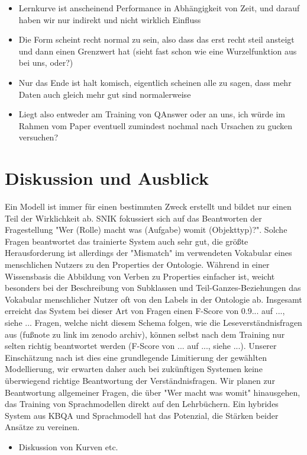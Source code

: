 \documentclass[utf8,biblatex]{lni}
\begin{document}
\begin{itemize}
\begin{itemize}
    \item Lernkurve ist anscheinend Performance in Abhängigkeit von Zeit, und darauf haben wir nur indirekt und nicht wirklich Einfluss
    \item Die Form scheint recht normal zu sein, also dass das erst recht steil ansteigt und dann einen Grenzwert hat (sieht fast schon wie eine Wurzelfunktion aus bei uns, oder?)
    \item Nur das Ende ist halt komisch, eigentlich scheinen alle zu sagen, dass mehr Daten auch gleich mehr gut sind normalerweise
    \item Liegt also entweder am Training von QAnswer oder an uns, ich würde im Rahmen vom Paper eventuell zumindest nochmal nach Ursachen zu gucken versuchen?
  \end{itemize}
\end{itemize}


\section{Diskussion und Ausblick}

Ein Modell ist immer für einen bestimmten Zweck erstellt und bildet nur einen Teil der Wirklichkeit ab.
SNIK fokussiert sich auf das Beantworten der Fragestellung "Wer (Rolle) macht was (Aufgabe) womit (Objekttyp)?".
Solche Fragen beantwortet das trainierte System auch sehr gut, die größte Herausforderung ist allerdings der "Mismatch" im verwendeten Vokabular eines menschlichen Nutzers zu den Properties der Ontologie.
Während in einer Wissensbasis die Abbildung von Verben zu Properties einfacher ist, weicht besonders bei der Beschreibung von Subklassen und Teil-Ganzes-Beziehungen das Vokabular menschlicher Nutzer oft von den Labels in der Ontologie ab.
Insgesamt erreicht das System bei dieser Art von Fragen  einen F-Score von 0.9... auf ..., siehe ...
Fragen, welche nicht diesem Schema folgen, wie die Leseverständnisfragen aus \cite{bb} (fußnote zu link im zenodo archiv), können selbst nach dem Training nur selten richtig beantwortet werden (F-Score von ... auf ..., siehe ...).
Unserer Einschätzung nach ist dies eine grundlegende Limitierung der gewählten Modellierung, wir erwarten daher auch bei zukünftigen Systemen keine überwiegend richtige Beantwortung der Verständnisfragen.
Wir planen zur Beantwortung allgemeiner Fragen, die über "Wer macht was womit" hinausgehen, das Training von Sprachmodellen direkt auf den Lehrbüchern.
Ein hybrides System aus KBQA und Sprachmodell hat das Potenzial, die Stärken beider Ansätze zu vereinen.

\begin{itemize}
  \item Diskussion von Kurven etc.
\end{itemize}

\printbibliography
\end{document}
